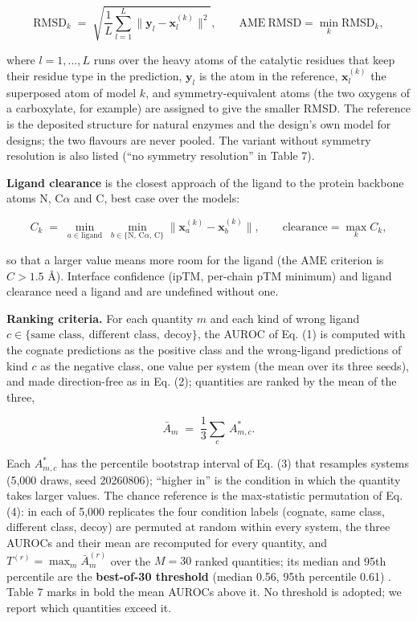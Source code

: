 \documentclass[
  10pt,
]{article}
\DeclareRobustCommand{\_}{\textunderscore\hspace{0pt}}
\begin{document}
\begin{equation*}\mathrm{RMSD}_k \;=\; \sqrt{\frac{1}{L}\sum_{l=1}^{L}\big\lVert \mathbf{y}_l - \mathbf{x}_{l}^{(k)}\big\rVert^{2}}, \qquad \mathrm{AME\ RMSD} = \min_{k} \mathrm{RMSD}_k, \tag{7}\end{equation*}

where
\(l = 1,\dots,L\)
runs over the heavy
atoms of the
catalytic residues
that keep their
residue type in the
prediction,
\(\mathbf{y}_l\) is
the atom in the
reference,
\(\mathbf{x}^{(k)}_l\)
the superposed atom
of model \(k\), and
symmetry-equivalent
atoms (the two
oxygens of a
carboxylate, for
example) are
assigned to give the
smaller RMSD. The
reference is the
deposited structure
for natural enzymes
and the design's own
model for designs;
the two flavours are
never pooled. The
variant without
symmetry resolution
is also listed (``no
symmetry
resolution'' in
Table 7).

\textbf{Ligand
clearance} is the
closest approach of
the ligand to the
protein backbone
atoms N, C\(\alpha\)
and C, best case
over the models:

\begin{equation*}C_k \;=\; \min_{a \in \text{ligand}}\ \min_{b \in \{\mathrm{N},\,\mathrm{C}\alpha,\,\mathrm{C}\}} \big\lVert \mathbf{x}_a^{(k)} - \mathbf{x}_b^{(k)}\big\rVert, \qquad \mathrm{clearance} = \max_{k} C_k , \tag{8}\end{equation*}

so that a larger
value means more
room for the ligand
(the AME criterion
is \(C > 1.5\) Å).
Interface confidence
(ipTM, per-chain pTM
minimum) and ligand
clearance need a
ligand and are
undefined without
one.

\textbf{Ranking
criteria.} For each
quantity \(m\) and
each kind of wrong
ligand
\(c \in \{\text{same class},\ \text{different class},\ \text{decoy}\}\),
the AUROC of Eq. (1)
is computed with the
cognate predictions
as the positive
class and the
wrong-ligand
predictions of kind
\(c\) as the
negative class, one
value per system
(the mean over its
three seeds), and
made direction-free
as in Eq. (2);
quantities are
ranked by the mean
of the three,

\begin{equation*}\bar A_m \;=\; \frac{1}{3}\sum_{c}\, A^{*}_{m,c}. \tag{9}\end{equation*}

Each \(A^{*}_{m,c}\)
has the percentile
bootstrap interval
of Eq. (3) that
resamples systems
(5,000 draws, seed
20260806); ``higher
in'' is the
condition in which
the quantity takes
larger values. The
chance reference is
the max-statistic
permutation of Eq.
(4): in each of
5,000 replicates the
four condition
labels (cognate,
same class,
different class,
decoy) are permuted
at random within
every system, the
three AUROCs and
their mean are
recomputed for every
quantity, and
\(T^{(r)} = \max_{m} \bar A^{(r)}_m\)
over the \(M = 30\)
ranked quantities;
its median and 95th
percentile are the
\textbf{best-of-30
threshold} (median
0.56, 95th
percentile 0.61)
\cite{westfall1993}.
Table 7 marks in
bold the mean AUROCs
above it. No
threshold is
adopted; we report
which quantities
exceed it.
\end{document}
